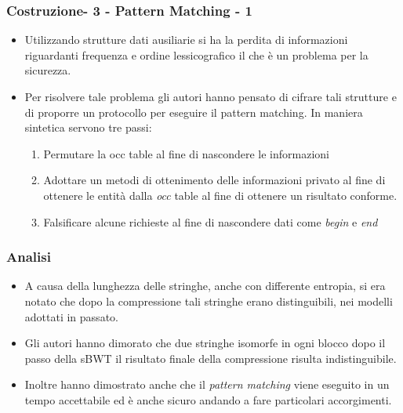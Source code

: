 \documentclass{beamer}
\begin{document}
\begin{frame}
\frametitle{Costruzione- 3 - Pattern Matching - 1}
\begin{itemize}
	\item Utilizzando strutture dati ausiliarie si ha la perdita di informazioni riguardanti frequenza e ordine lessicografico il che è un problema per la sicurezza.\pause
	\item Per risolvere tale problema gli autori hanno pensato di cifrare tali strutture e di proporre un protocollo per eseguire il pattern matching. In maniera sintetica servono tre passi:\pause
	\begin{enumerate}
		\item Permutare la occ table al fine di nascondere le informazioni
		\item Adottare un metodi di ottenimento delle informazioni privato al fine di ottenere le entità dalla \textit{occ} table al fine di ottenere un risultato conforme.\pause
		\item Falsificare alcune richieste al fine di nascondere dati come \textit{begin} e \textit{end}\pause
		
	\end{enumerate}	 
\end{itemize}
\end{frame}
\begin{frame}
\frametitle{Analisi}
\begin{itemize}
	\item A causa della lunghezza delle stringhe, anche con differente entropia, si era notato che dopo la compressione tali stringhe erano distinguibili, nei modelli adottati in passato.\pause
	\item Gli autori hanno dimorato che  due stringhe isomorfe in ogni blocco dopo il passo della sBWT il risultato finale della compressione risulta indistinguibile.\pause
	\item Inoltre hanno dimostrato anche che il \textit{pattern matching} viene eseguito in un tempo accettabile ed è anche sicuro andando a fare particolari accorgimenti. 
\end{itemize}
\end{frame}

\end{document}
